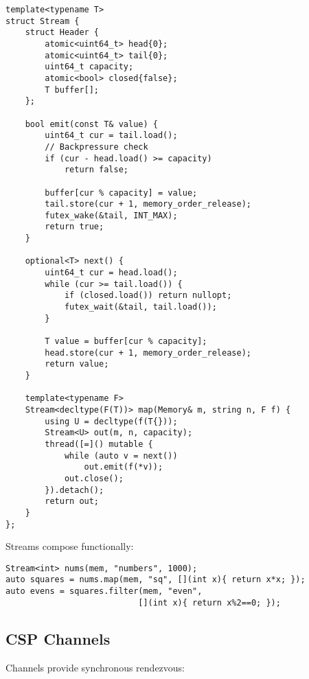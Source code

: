 \documentclass[sigconf,anonymous]{acmart}
\begin{document}
\begin{lstlisting}[caption={Lock-Free Stream with Ring Buffer}]
template<typename T>
struct Stream {
    struct Header {
        atomic<uint64_t> head{0};
        atomic<uint64_t> tail{0};
        uint64_t capacity;
        atomic<bool> closed{false};
        T buffer[];
    };
    
    bool emit(const T& value) {
        uint64_t cur = tail.load();
        // Backpressure check
        if (cur - head.load() >= capacity)
            return false;
            
        buffer[cur % capacity] = value;
        tail.store(cur + 1, memory_order_release);
        futex_wake(&tail, INT_MAX);
        return true;
    }
    
    optional<T> next() {
        uint64_t cur = head.load();
        while (cur >= tail.load()) {
            if (closed.load()) return nullopt;
            futex_wait(&tail, tail.load());
        }
        
        T value = buffer[cur % capacity];
        head.store(cur + 1, memory_order_release);
        return value;
    }
    
    template<typename F>
    Stream<decltype(F(T))> map(Memory& m, string n, F f) {
        using U = decltype(f(T{}));
        Stream<U> out(m, n, capacity);
        thread([=]() mutable {
            while (auto v = next())
                out.emit(f(*v));
            out.close();
        }).detach();
        return out;
    }
};
\end{lstlisting}

Streams compose functionally:
\begin{lstlisting}
Stream<int> nums(mem, "numbers", 1000);
auto squares = nums.map(mem, "sq", [](int x){ return x*x; });
auto evens = squares.filter(mem, "even", 
                           [](int x){ return x%2==0; });
\end{lstlisting}

\subsection{CSP Channels}

Channels provide synchronous rendezvous:
\end{document}
